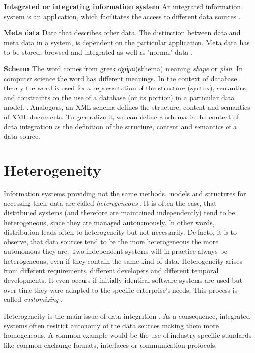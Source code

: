 \textbf{Integrated or integrating information system}\label{integrated_system_index} An integrated information system is an application, which facilitates the access to different data sources \cite[p. 7]{DBLP:books/dp/LeserN2006}.

\textbf{Meta data}\label{meta_data_index} Data that describes other data. The distinction between data and meta data in a system, is dependent on the particular application. Meta data has to be stored, browsed and integrated as well as 'normal' data \cite[p. 8]{DBLP:books/dp/LeserN2006}.

\textbf{Schema}\label{schema_index} The word comes from greek \foreignlanguage{greek}{\emph{σχήμα}}(skhēma) meaning \emph{shape} or \emph{plan}. In computer science the word has different meanings. 
In the context of database theory the word is used for a representation of the structure (syntax), semantics, and constraints on the use of a database (or its portion) in a particular data model. \cite[p. 235]{Sheth:1990:FDS:96602.96604}. Analogous, an XML schema defines the structure, content and semantics of XML documents\cite{w3XMLSchema}. To generalize it, we can define a schema in the context of data integration as the definition of the structure, content and semantics of a data source.

\section{Heterogeneity}

Information systems providing not the same methods, models and structures for accessing their data are called \textit{heterogeneous} \cite[p. 58]{DBLP:books/dp/LeserN2006}. It is often the case, that distributed systems (and therefore are maintained independently) tend to be heterogeneous, since they are managed autonomously. In other words, distribution leads often to heterogeneity but not necessarily. De facto, it is to observe, that data sources tend to be the more heterogeneous the more autonomous they are. Two independent systems will in practice always  be heterogeneous, even if they contain the same kind of data. Heterogeneity arises from different requirements, different developers and different temporal developments. It even occurs if initially identical software systems are used but over time they were adapted to the specific enterprise's needs. This process is called \textit{customizing}  \cite[p. 59]{DBLP:books/dp/LeserN2006}. 

Heterogeneity is the main issue of data integration \cite[p. 59]{DBLP:books/dp/LeserN2006}. As a consequence, integrated systems often restrict autonomy of the data sources making them more homogeneous. A common example would be the use of industry-specific standards like common exchange formats, interfaces or communication protocols.

